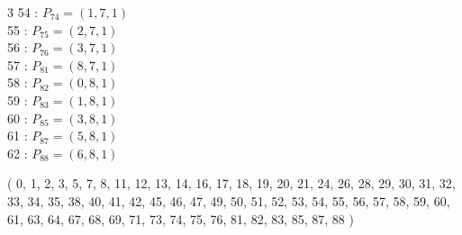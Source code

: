 \documentclass{article}
\begin{document}
{\begin{multicols}{3}
54 : $P_{74}=( 1, 7, 1 )$\\
55 : $P_{75}=( 2, 7, 1 )$\\
56 : $P_{76}=( 3, 7, 1 )$\\
57 : $P_{81}=( 8, 7, 1 )$\\
58 : $P_{82}=( 0, 8, 1 )$\\
59 : $P_{83}=( 1, 8, 1 )$\\
60 : $P_{85}=( 3, 8, 1 )$\\
61 : $P_{87}=( 5, 8, 1 )$\\
62 : $P_{88}=( 6, 8, 1 )$\\
\end{multicols}
( 0, 1, 2, 3, 5, 7, 8, 11, 12, 13, 14, 16, 17, 18, 19, 20, 21, 24, 26, 28, 29, 30, 31, 32, 33, 34, 35, 38, 40, 41, 42, 45, 46, 47, 49, 50, 51, 52, 53, 54, 55, 56, 57, 58, 59, 60, 61, 63, 64, 67, 68, 69, 71, 73, 74, 75, 76, 81, 82, 83, 85, 87, 88 )\\
}
\end{document}
